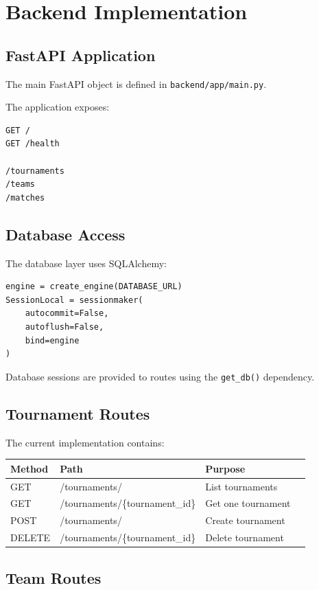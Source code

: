 \documentclass[11pt,a4paper]{article}
\begin{document}
\section{Backend Implementation}

\subsection{FastAPI Application}

The main FastAPI object is defined in
\texttt{backend/app/main.py}.

The application exposes:

\begin{lstlisting}
GET /
GET /health

/tournaments
/teams
/matches
\end{lstlisting}

\subsection{Database Access}

The database layer uses SQLAlchemy:

\begin{lstlisting}
engine = create_engine(DATABASE_URL)
SessionLocal = sessionmaker(
    autocommit=False,
    autoflush=False,
    bind=engine
)
\end{lstlisting}

Database sessions are provided to routes using the
\texttt{get\_db()} dependency.

\subsection{Tournament Routes}

The current implementation contains:

\begin{longtable}{llll}
\toprule
\textbf{Method} & \textbf{Path} & \textbf{Purpose}\\
\midrule
GET & /tournaments/ & List tournaments\\
GET & /tournaments/\{tournament\_id\} & Get one tournament\\
POST & /tournaments/ & Create tournament\\
DELETE & /tournaments/\{tournament\_id\} & Delete tournament\\
\bottomrule
\end{longtable}

\subsection{Team Routes}
\end{document}
